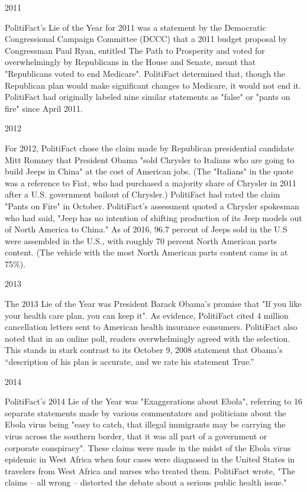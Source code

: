 2011

PolitiFact's Lie of the Year for 2011 was a statement by the Democratic
Congressional Campaign Committee (DCCC) that a 2011 budget proposal by
Congressman Paul Ryan, entitled The Path to Prosperity and voted for
overwhelmingly by Republicans in the House and Senate, meant that
"Republicans voted to end Medicare". PolitiFact determined that, though
the Republican plan would make significant changes to Medicare, it would
not end it. PolitiFact had originally labeled nine similar statements as
"false" or "pants on fire" since April 2011.

2012

For 2012, PolitiFact chose the claim made by Republican presidential
candidate Mitt Romney that President Obama "sold Chrysler to Italians
who are going to build Jeeps in China" at the cost of American jobs.
(The "Italians" in the quote was a reference to Fiat, who had purchased
a majority share of Chrysler in 2011 after a U.S. government bailout of
Chrysler.) PolitiFact had rated the claim "Pants on Fire" in October.
PolitiFact's assessment quoted a Chrysler spokesman who had said, "Jeep
has no intention of shifting production of its Jeep models out of North
America to China." As of 2016, 96.7 percent of Jeeps sold in the U.S
were assembled in the U.S., with roughly 70 percent North American parts
content. (The vehicle with the most North American parts content came in
at 75\%).

2013

The 2013 Lie of the Year was President Barack Obama's promise that "If
you like your health care plan, you can keep it". As evidence,
PolitiFact cited 4 million cancellation letters sent to American health
insurance consumers. PolitiFact also noted that in an online poll,
readers overwhelmingly agreed with the selection. This stands in stark
contrast to its October 9, 2008 statement that Obama's ``description of
his plan is accurate, and we rate his statement True.''

2014

PolitiFact's 2014 Lie of the Year was "Exaggerations about Ebola",
referring to 16 separate statements made by various commentators and
politicians about the Ebola virus being "easy to catch, that illegal
immigrants may be carrying the virus across the southern border, that it
was all part of a government or corporate conspiracy". These claims were
made in the midst of the Ebola virus epidemic in West Africa when four
cases were diagnosed in the United States in travelers from West Africa
and nurses who treated them. PolitiFact wrote, "The claims -- all wrong
-- distorted the debate about a serious public health issue."

